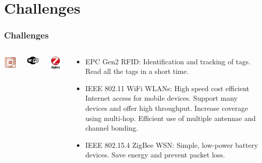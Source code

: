 \documentclass{beamer}
\begin{document}
\section{Challenges}
\begin{frame}
  \frametitle{Challenges}
  \begin{columns}[t]
      \begin{center}
        \includegraphics[width=1.0in]{figures/rfid}
      \end{center}
      \begin{center}
        \includegraphics[width=1.0in]{figures/wifi}
      \end{center}
      \begin{center}
        \includegraphics[width=1.0in]{figures/zigbee}
      \end{center}
      \begin{block}{}
        \begin{itemize}
          \item EPC Gen2 RFID: Identification and tracking of tags. Read all the tags in a short time.
          \item IEEE 802.11 WiFi WLANs: High speed cost efficient Internet access for mobile devices. Support many devices and offer high throughput. Increase coverage using multi-hop. Efficient use of multiple antennae and channel bonding.
          \item IEEE 802.15.4 ZigBee WSN: Simple, low-power battery devices. Save energy and prevent packet loss.
        \end{itemize}
      \end{block}
  \end{columns}
\end{frame}
\end{document}
